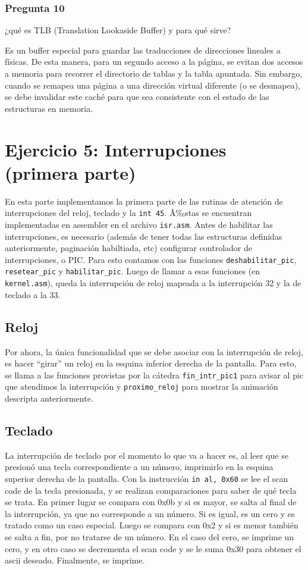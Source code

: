 \documentclass[10pt, a4paper]{article}
\begin{document}
\subsubsection*{Pregunta 10}
 \begin{framed}
¿qué es TLB (Translation Lookaside Buffer) y para qué sirve?
\end{framed}
Es un buffer especial para guardar las traducciones de direcciones lineales a físicas. De esta manera, para un segundo acceso a la página, se evitan dos accesos a memoria para recorrer el directorio de tablas y la tabla apuntada. Sin embargo, cuando se remapea una página a una dirección virtual diferente (o se desmapea), se debe invalidar este caché para que sea consistente con el estado de las estructuras en memoria.

\newpage
\section{Ejercicio 5: Interrupciones (primera parte)}
En esta parte implementamos la primera parte de las rutinas de atención de interrupciones del reloj, teclado y la \texttt{int 45}. 
Ã‰stas se encuentran implementadas en assembler en el archivo \texttt{isr.asm}.
Antes de habilitar las interrupciones, es necesario (además de tener todas las estructuras definidas anteriormente, paginación habiltiada, etc) configurar controlador de interrupciones,
o PIC. Para esto contamos con las funciones \texttt{deshabilitar\_pic}, \texttt{resetear\_pic} y \texttt{habilitar\_pic}. Luego de llamar a esas funciones (en \texttt{kernel.asm}), queda la 
interrupción de reloj mapeada a la interrupción 32 y la de teclado a la 33.
\subsection{Reloj}
Por ahora, la única funcionalidad que se debe asociar con la interrupción de reloj, es hacer ``girar'' un reloj en la esquina inferior derecha de la pantalla. 
Para esto, se llama a las funciones provistas por la cátedra \texttt{fin\_intr\_pic1} para avisar al pic que atendimos la interrupción y \texttt{proximo\_reloj} 
para mostrar la animación descripta anteriormente.

\subsection{Teclado}

La interrupción de teclado por el momento lo que va a hacer es, al leer que se presionó una tecla correspondiente a un número, imprimirlo en la esquina superior 
derecha de la pantalla. Con la instrucción \texttt{in al, 0x60} se lee el scan code de la tecla presionada, y se realizan comparaciones para saber de qué tecla se 
trata. En primer lugar se compara con 0x0b y si es mayor, se salta al final de la interrupción, ya que no corresponde a un número. Si es igual, es un cero y es 
tratado como un caso especial. Luego se compara con 0x2 y si es menor también se salta a fin, por no tratarse de un número. En el caso del cero, se imprime un cero,
y en otro caso se decrementa el scan code y se le suma 0x30 para obtener el ascii deseado. Finalmente, se imprime.
\end{document}
